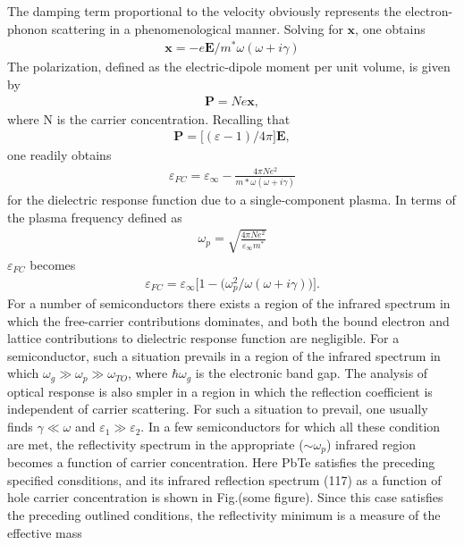 The damping term proportional to the velocity obviously represents the electron-phonon scattering in 
a phenomenological manner. Solving for $\boldsymbol x$, one obtains
\begin{align}
   \boldsymbol x = -e \boldsymbol E /m^* \omega (\omega + i \gamma)
\end{align}
The polarization, defined as the electric-dipole moment per unit volume, is given by
\begin{align}
   \boldsymbol P = Ne \boldsymbol x,
\end{align}
where N is the carrier concentration. Recalling that 
\begin{align}
   \boldsymbol P =  \big[ (\varepsilon - 1)/ 4\pi \big] \boldsymbol E,
\end{align}
one readily obtains
\begin{align}
   \varepsilon_{FC} = \varepsilon_{\infty} - \frac{4 \pi N e^2}{m*\omega(\omega + i \gamma)}
\end{align}
for the dielectric response function due to a single-component plasma. In terms of the plasma frequency
defined as 
\begin{align}
   \omega_p = \sqrt{\frac{4\pi N e^2}{\varepsilon_{\infty} m^*}}
\end{align}
$\varepsilon_{FC}$ becomes
\begin{align}
   \varepsilon_{FC} = \varepsilon_{\infty} \big[ 1 - \big(\omega_p^2/\omega(\omega + i \gamma)\big)\big].
\end{align}
For a number of semiconductors there exists a region of the infrared spectrum in which the free-carrier 
contributions dominates, and both the bound electron and lattice contributions to dielectric response
function are negligible. For a semiconductor, such a situation prevails in a region of the infrared
spectrum in which $\omega_g \gg \omega_p \gg \omega_{TO}$, where $\hbar \omega_g$ is the
electronic band gap. The analysis of optical response is also smpler in a region in which the reflection
coefficient is independent of carrier scattering. For such a situation to prevail, one usually finds
$\gamma \ll \omega$ and $\varepsilon_1 \gg \varepsilon_2$. In a few semiconductors for
which all these condition are met, the reflectivity spectrum in the appropriate ($\sim \omega_p$) infrared
region becomes a function of carrier concentration. Here
PbTe satisfies the preceding specified consditions, and its infrared reflection spectrum (117)
as a function of hole carrier concentration is shown in Fig.(some figure). Since this case satisfies
the preceding outlined conditions, the reflectivity minimum is a measure of the effective mass
